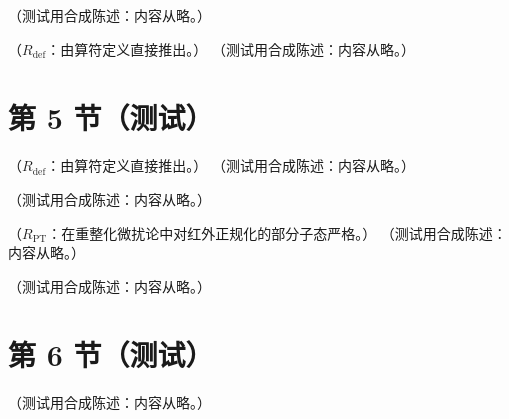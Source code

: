 \begin{definition}[BRST 变换]\label{def:prelim-brst}
（测试用合成陈述：内容从略。）
\end{definition}

\begin{lemma}[$s^2=0$ 与拉氏量的 BRST 不变性 \tagR]\label{lem:prelim-brst-nilpotent}
（$R_{\mathrm{def}}$：由算符定义直接推出。）
（测试用合成陈述：内容从略。）
\end{lemma}

\section{第 5 节（测试）}\label{sec:qcd-regularization}

\begin{proposition}\label{prop:qcd-brst-cohomology}
（$R_{\mathrm{def}}$：由算符定义直接推出。）
（测试用合成陈述：内容从略。）
\end{proposition}

\begin{example}[单一动量模式的四重态]\label{ex:qcd-brst-quartet}
（测试用合成陈述：内容从略。）
\end{example}

\begin{lemma}\label{lem:qcd-st-regularized}
（$R_{\mathrm{PT}}$：在重整化微扰论中对红外正规化的部分子态严格。）
（测试用合成陈述：内容从略。）
\end{lemma}

\begin{definition}[重整化常数与抵消项]\label{def:qcd-renormalization}
（测试用合成陈述：内容从略。）
\end{definition}

\section{第 6 节（测试）}\label{sec:prelim-brst}

\begin{definition}[$\overline{\rm MS}$ 方案]\label{def:prelim-msbar}
（测试用合成陈述：内容从略。）
\end{definition}

